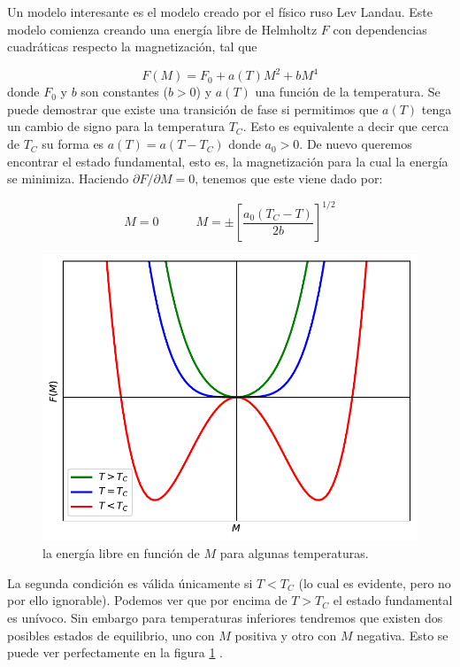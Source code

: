 \documentclass[12pt,a4paper]{book}
\numberwithin{equation}{section}
\numberwithin{figure}{section}
\newcommand{\tquad}{\quad \quad \quad}
\newcommand{\ccorchetes}[1]{\left[ #1  \right]}
\begin{document}
Un modelo interesante es el modelo creado por el físico ruso Lev Landau. Este modelo comienza creando una energía libre de Helmholtz $F$ con dependencias cuadráticas respecto la magnetización, tal que

\begin{equation}
    F(M) = F_0 + a(T) M^2 + bM^4
\end{equation}
donde $F_0$ y $b$ son constantes ($b>0$) y $a(T)$ una función de la temperatura. Se puede demostrar que existe una transición de fase si permitimos que $a(T)$ tenga un cambio de signo para la temperatura $T_C$. Esto es equivalente a decir que cerca de $T_C$ su forma es $a(T)=a(T-T_C)$ donde $a_0>0$. De nuevo queremos encontrar el estado fundamental, esto es, la magnetización para la cual la energía se minimiza. Haciendo $\partial F / \partial M = 0 $, tenemos que este viene dado por:

\begin{equation}
    M=0 \tquad M = \pm \ccorchetes{\frac{a_0 (T_C-T)}{2b}}^{1/2}
\end{equation}

\begin{figure}[h!]
    \centering
    \includegraphics[scale=0.8]{06-Landau.pdf}
    \caption{la energía libre en función de $M$ para algunas temperaturas.}
    \label{Fig:06-02-01}
\end{figure}

La segunda condición es válida únicamente si $T<T_C$ (lo cual es evidente, pero no por ello ignorable). Podemos ver que por encima de $T>T_C$ el estado fundamental es unívoco. Sin embargo para temperaturas inferiores tendremos que existen dos posibles estados de equilibrio, uno con $M$ positiva y otro con $M$ negativa. Esto se puede ver perfectamente en la figura \ref{Fig:06-02-01} . \\
\end{document}
